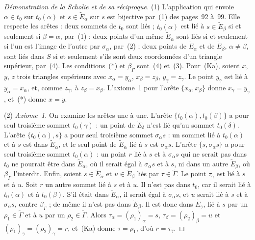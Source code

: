 \begin{proof}[Démonstration de la Scholie et de sa réciproque]
(1) L'application qui envoie $\alpha \in t_0$ sur $t_0(\alpha)$ et $s \in \widetilde E_\alpha$ sur $s$ est bijective par~(1) des pages~92 à~99. Elle respecte les arêtes : deux sommets de $t_0$ sont liés ; $t_0(\alpha)$ est lié à $s \in \widetilde E_\beta$ si et seulement si $\beta = \alpha$, par~(1) ; deux points d'un même $\widetilde E_\alpha$ sont liés si et seulement si l'un est l'image de l'autre par $\sigma_\alpha$, par~(2) ; deux points de $\widetilde E_\alpha$ et de $\widetilde E_\beta$, $\alpha \neq \beta$, sont liés dans $S$ si et seulement s'ils sont deux coordonnées d'un triangle supérieur, par~(4). Les conditions~(*) et $\beta_{\widetilde\Gamma}$ sont~(4) et~(3). Pour~(Ka), soient $x$, $y$, $z$ trois triangles supérieurs avec $x_\alpha = y_\alpha$, $x_\beta = z_\beta$, $y_\gamma = z_\gamma$. Le point $y_\gamma$ est lié à $y_\alpha = x_\alpha$, et, comme $z_\gamma$, à $z_\beta = x_\beta$. L'axiome~1 pour l'arête $\{x_\alpha, x_\beta\}$ donne $x_\gamma = y_\gamma$, et~(*) donne $x = y$.

(2) \emph{Axiome~1.} On examine les arêtes une à une. L'arête $\{t_0(\alpha), t_0(\beta)\}$ a pour seul troisième sommet $t_0(\gamma)$ : un point de $\widetilde E_\delta$ n'est lié qu'au sommet $t_0(\delta)$. L'arête $\{t_0(\alpha), s\}$ a pour seul troisième sommet $\sigma_\alpha s$ : un sommet lié à $t_0(\alpha)$ et à $s$ est dans $\widetilde E_\alpha$, et le seul point de $\widetilde E_\alpha$ lié à $s$ est $\sigma_\alpha s$. L'arête $\{s, \sigma_\alpha s\}$ a pour seul troisième sommet $t_0(\alpha)$ : un point $r$ lié à $s$ et à $\sigma_\alpha s$ qui ne serait pas dans $t_0$ ne pourrait être dans $\widetilde E_\alpha$, où il serait égal à $\sigma_\alpha s$ et à $s$, ni dans un autre $\widetilde E_\beta$, où $\beta_{\widetilde\Gamma}$ l'interdit. Enfin, soient $s \in \widetilde E_\alpha$ et $u \in \widetilde E_\beta$ liés par $\tau \in \widetilde\Gamma$. Le point $\tau_\gamma$ est lié à $s$ et à $u$. Soit $r$ un autre sommet lié à $s$ et à $u$. Il n'est pas dans $t_0$, car il serait lié à $t_0(\alpha)$ et à $t_0(\beta)$. S'il était dans $\widetilde E_\alpha$, il serait égal à $\sigma_\alpha s$, et $u$ serait lié à $s$ et à $\sigma_\alpha s$, contre $\beta_{\widetilde\Gamma}$ ; de même il n'est pas dans $\widetilde E_\beta$. Il est donc dans $\widetilde E_\gamma$, lié à $s$ par un $\rho_1 \in \widetilde\Gamma$ et à $u$ par un $\rho_2 \in \widetilde\Gamma$. Alors $\tau_\alpha = (\rho_1)_\alpha = s$, $\tau_\beta = (\rho_2)_\beta = u$ et $(\rho_1)_\gamma = (\rho_2)_\gamma = r$, et~(Ka) donne $\tau = \rho_1$, d'où $r = \tau_\gamma$.


\end{proof}
